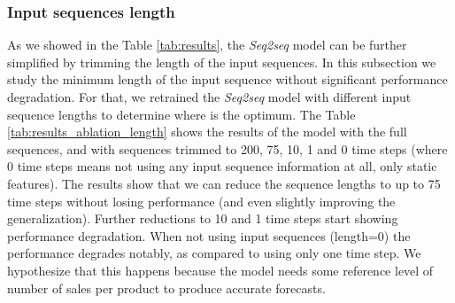 \documentclass{elsarticle}
\begin{document}
	\subsubsection{Input sequences length}
	As we showed in the Table \ref{tab:results}, the \textit{Seq2seq} model can be further simplified by trimming the length of the input sequences. In this subsection we study the minimum length of the input sequence without significant performance degradation. For that, we retrained the \textit{Seq2seq} model with different input sequence lengths to determine where is the optimum. The Table 		\ref{tab:results_ablation_length} shows the results of the model with the full sequences, and with sequences trimmed to 200, 75, 10, 1 and 0 time steps (where 0 time steps means not using any input sequence information at all, only static features). The results show that we can reduce the sequence lengths to up to 75 time steps without losing performance (and even slightly improving the generalization). Further reductions to 10 and 1 time steps start showing performance degradation. When not using input sequences (length=0) the performance degrades notably, as compared to using only one time step. We hypothesize that this happens because the model needs some reference level of number of sales per product to produce accurate forecasts. 
	
\end{document}
